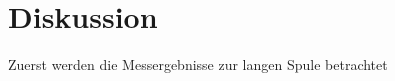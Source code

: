\section{Diskussion}
\label{sec:Diskussion}
Zuerst werden die Messergebnisse zur langen Spule betrachtet
